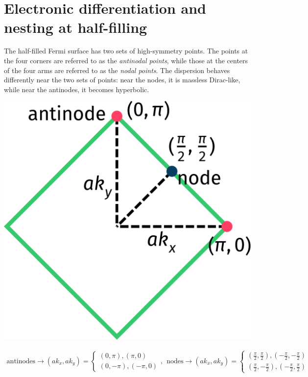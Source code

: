 \documentclass{article}
\begin{document}
\section{Electronic differentiation and nesting at half-filling}
\begin{minipage}{0.65\textwidth}
	The half-filled Fermi surface has two sets of high-symmetry points. The points at the four corners are referred to as the \textit{antinodal points}, while those at the centers of the four arms are referred to as the \textit{nodal points}. The dispersion behaves differently near the two sets of points: near the nodes, it is massless Dirac-like, while near the antinodes, it becomes hyperbolic.
\end{minipage}
\hspace*{\fill}
\begin{minipage}{0.3\textwidth}
	\centering
	\includegraphics[width=\textwidth]{./Fsurf.pdf}
\end{minipage}

\begin{equation*}\begin{aligned}
	\text{antinodes} \to \left(ak_x, ak_y\right) = \begin{cases}
\left(0, \pi \right), \left(\pi, 0 \right)\\
\left(0, -\pi \right), \left(-\pi, 0\right)
	\end{cases}, ~ ~ \text{nodes} \to \left(ak_x, ak_y\right) = \begin{cases}
		\left(\frac{\pi}{2}, \frac{\pi}{2} \right), \left(-\frac{\pi}{2}, -\frac{\pi}{2}\right)\\
		\left(\frac{\pi}{2}, -\frac{\pi}{2} \right), \left(-\frac{\pi}{2}, \frac{\pi}{2}\right)
	\end{cases}
\end{aligned}\end{equation*}
\end{document}
